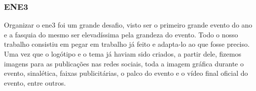 
\subsubsection{ENE3}

Organizar o \acrshort{ene3} foi um grande desafio, visto ser o primeiro grande evento do ano e a fasquia do mesmo ser elevadíssima pela grandeza do evento. Todo o nosso trabalho consistiu em pegar em trabalho já feito e adapta-lo ao que fosse preciso. Uma vez que o logótipo e o tema já haviam sido criados, a partir dele, fizemos imagens para as publicações nas redes sociais, toda a imagem gráfica durante o evento, sinalética, faixas publicitárias, o palco do evento e o vídeo final oficial do evento, entre outros.